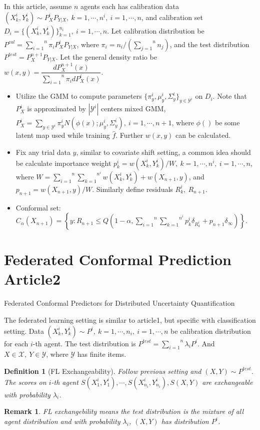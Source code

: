 \documentclass[12pt, a4paper, oneside]{article}
\newtheorem{definition}[theorem]{Definition}
\newtheorem{remark}[theorem]{Remark}
\begin{document}
    In this article, assume $n$ agents each has calibration data $(X_k^i,Y_k^i)\sim P_X^iP_{Y|X},\ k=1,\cdots,n^i,\ i=1,\cdots,n$, and calibration set $D_i=\{(X_k^i,Y_k^i)\}_{k=1}^{n_i},\ i=1,\cdots,n$. Let calibration distribution be $P^{cal}=\overset{n}{\underset{i=1}\sum}\pi_iP_X^iP_{Y|X}$, where $\pi_i=n_i/\left( \overset{n}{\underset{j=1}\sum}n_j \right)$, and the test distribution $P^{test}=P_X^{n+1}P_{Y|X}$. Let the general density ratio be $w(x,y)=\dfrac{dP_X^{n+1}(x)}{\overset{n}{\underset{i=1}\sum}\pi_idP_X^i(x)}$.
    \begin{itemize}
        \item Utilize the GMM to compute parameters $\{\pi_y^i,\mu_y^i,\Sigma_y^i\}_{y\in\mathcal{Y}^i}$ on $D_i$. Note that $P_X^i$ is approximated by $|\mathcal{Y}^i|$ centers mixed GMM, $P_X^i=\overset{}{\underset{y\in\mathcal{Y}^i}\sum\pi_y^iN(\phi(x);\mu_y^i,\Sigma_y^i)},\ i=1,\cdots,n+1$, where $\phi()$ be some latent map used while training $\hat{f}$. Further $w(x,y)$ can be calculated.
        \item Fix any trial data $y$, similar to covariate shift setting, a common idea should be calculate importance weight $p_k^i=w(X_k^i,Y_k^i)/W,\ k=1,\cdots,n^i,\ i=1,\cdots,n$, where $W=\overset{n}{\underset{i=1}\sum}\overset{n^i}{\underset{k=1}\sum}w(X_k^i,Y_k^i)+w(X_{n+1},y)$, and $p_{n+1}=w(X_{n+1},y)/W$. Similarly define residuals $R_k^i,\ R_{n+1}$.
        \item Conformal set: $C_\alpha(X_{n+1})=\left\{ y: R_{n+1}\leq Q(1-\alpha,\overset{n}{\underset{i=1}\sum}\overset{n^i}{\underset{k=1}\sum}p_k^i\delta_{R_k^i}+p_{n+1}\delta_{\infty})\right\}$.
    \end{itemize}


\section{Federated Conformal Prediction Article2}
    Federated Conformal Predictors for Distributed Uncertainty Quantification\cite{lu2023federated}


    The federated learning setting is similar to article1, but specific with classification setting. Data $(X_k^i,Y_k^i)\sim P^i,\ k=1,\cdots,n_i,\ i=1,\cdots,n$ be calibration distribution for each $i$-th agent. The test distribution is $P^{test}=\overset{n}{\underset{i=1}\sum}\lambda_iP^i$. And $X\in\mathcal{X},\ Y\in\mathcal{Y}$, where $\mathcal{Y}$ has finite items.


    \begin{definition}[FL Exchangeability]
        Follow previous setting and $(X,Y)\sim P^{test}$. The scores on $i$-th agent $S(X_1^i,Y_1^i),\cdots,S(X_{n_i}^i,Y_{n_i}^i),S(X,Y)$ are exchangeable with probability $\lambda_i$. 
    \end{definition}
    \begin{remark}
        FL exchangebility means the test distribution is the mixture of all agent distribution and with probability $\lambda_i$, $(X,Y)$ has distribution $P^i$.
    \end{remark}
\end{document}
